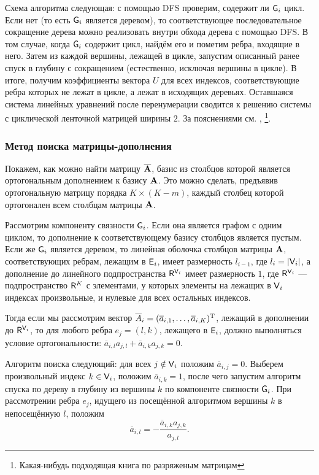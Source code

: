 \documentclass[10pt]{article}
\begin{document}
Схема алгоритма следующая: с помощью DFS проверим, содержит ли $\mathsf{G}_i$ цикл. Если нет (то есть $\mathsf{G}_i$ является деревом), то соответствующее последовательное сокращение дерева можно реализовать внутри обхода дерева с помощью DFS. В том случае, когда $\mathsf{G}_i$ содержит цикл, найдём его и пометим ребра, входящие в него. Затем из каждой вершины, лежащей в цикле, запустим описанный ранее спуск в глубину с сокращением (естественно, исключая вершины в цикле). В итоге, получим коэффициенты вектора $U$ для всех индексов, соответствующие ребра которых не лежат в цикле, а лежат в исходящих деревьях. Оставшаяся система линейных уравнений после перенумерации сводится к решению системы с циклической ленточной матрицей ширины $2$. За пояснениями см. \cite{cormen2009introduction}, \footnote{Какая-нибудь подходящая книга по разряженым матрицам}. %
\subsubsection{Метод поиска матрицы-дополнения}
Покажем, как можно найти матрицу $\overline {\mathbf{A}}$, базис из столбцов которой является ортогональным дополнением к базису $\mathbf{A}$. Это можно сделать, предъявив ортогональную матрицу порядка $K \times (K-m)$, каждый столбец которой ортогонален всем столбцам матрицы $\mathbf{A}$.

Рассмотрим компоненту связности $\mathsf{G}_i$. Если она является графом с одним циклом, то дополнение к соответствующему базису столбцов является пустым. Если же $\mathsf{G}_i$ является деревом, то линейная оболочка столбцов матрицы $\mathbf{A}$, соответствующих ребрам, лежащим в $\mathsf{E}_i$, имеет размерность $l_{i-1}$, где $l_i = | \mathsf{V}_i |$, а дополнение до линейного подпространства $\mathsf{R}^{\mathsf{V}_i}$ имеет размерность $1$, где $\mathsf{R}^{\mathsf{V}_i}$ --- подпространство $\mathsf{R}^K$ с элементами, у которых элементы на лежащих в $\mathsf{V}_i$ индексах произвольные, и нулевые для всех остальных индексов.

Тогда если мы рассмотрим вектор $\overline A_i = (\overline a_{i, 1}, \ldots, \overline a_{i, K})^{\mathrm{T}}$, лежащий в дополнении до $\mathsf{R}^{\mathsf{V}_i}$, то для любого ребра $e_j= (l,k)$, лежащего в $\mathsf{E}_i$, должно выполняться условие ортогональности: $\overline a_{i, l} a_{j, l} + \overline a_{i, k} a_{j, k} = 0$.

Алгоритм поиска следующий: для всех $j \notin \mathsf{V}_i$ положим $\overline a_{i, j} = 0$. Выберем произвольный индекс $k \in \mathsf{V}_i$, положим $\overline a_{i, k} = 1$, после чего запустим алгоритм спуска по дереву в глубину из вершины $k$ по компоненте связности $\mathsf{G}_i$. При рассмотрении ребра $e_j$, идущего из посещённой алгоритмом вершины $k$ в непосещённую $l$, положим
\begin{equation*}
\overline a_{i, l} = -\frac{\overline a_{i, k} a_{j, k}}{a_{j, l}}.
\end{equation*}
\end{document}
